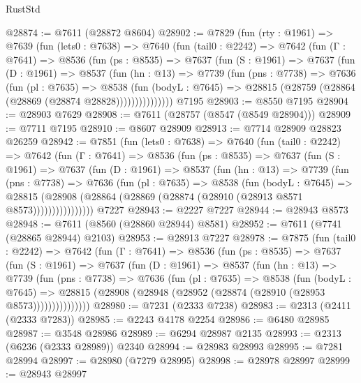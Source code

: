 \begin{lexlean}{RustStd}
\begin{coremodule}
{\begin{coremodule}
{{{{{{{{{{{{{{{{{{{{{{{{{{{{{{{{{{@28874 := @7611 (@28872 @8604)
@28902 := @7829
    (fun (rty : @1961) =>
    @7639
      (fun (lets0 : @7638) =>
      @7640
        (fun (tail0 : @2242) =>
        @7642
          (fun (Γ : @7641) =>
          @8536
            (fun (ps : @8535) =>
            @7637
              (fun (S : @1961) =>
              @7637
                (fun (D : @1961) =>
                @8537
                  (fun (hn : @13) =>
                  @7739
                    (fun (pns : @7738) =>
                    @7636
                      (fun (pl : @7635) =>
                      @8538
                        (fun (bodyL : @7645) =>
                        @28815 (@28759 (@28864 (@28869 (@28874 @28828)))))))))))))))
    @7195
@28903 := @8550 @7195
@28904 := @28903 @7629
@28908 := @7611 (@28757 (@8547 (@8549 @28904)))
@28909 := @7711 @7195
@28910 := @8607 @28909
@28913 := @7714 @28909 @28823 @26259
@28942 := @7851
    (fun (lets0 : @7638) =>
    @7640
      (fun (tail0 : @2242) =>
      @7642
        (fun (Γ : @7641) =>
        @8536
          (fun (ps : @8535) =>
          @7637
            (fun (S : @1961) =>
            @7637
              (fun (D : @1961) =>
              @8537
                (fun (hn : @13) =>
                @7739
                  (fun (pns : @7738) =>
                  @7636
                    (fun (pl : @7635) =>
                    @8538
                      (fun (bodyL : @7645) =>
                      @28815
                        (@28908 (@28864 (@28869 (@28874 (@28910 (@28913 @8571 @8573))))))))))))))))
    @7227
@28943 := @2227 @7227
@28944 := @28943 @8573
@28948 := @7611 (@8560 (@28860 @28944) @8581)
@28952 := @7611 (@7741 (@28865 @28944) @2103)
@28953 := @28913 @7227
@28978 := @7875
    (fun (tail0 : @2242) =>
    @7642
      (fun (Γ : @7641) =>
      @8536
        (fun (ps : @8535) =>
        @7637
          (fun (S : @1961) =>
          @7637
            (fun (D : @1961) =>
            @8537
              (fun (hn : @13) =>
              @7739
                (fun (pns : @7738) =>
                @7636
                  (fun (pl : @7635) =>
                  @8538
                    (fun (bodyL : @7645) =>
                    @28815 (@28908 (@28948 (@28952 (@28874 (@28910 (@28953 @8573)))))))))))))))
@28980 := @7231 (@2333 @7238)
@28983 := @2313 (@2411 (@2333 @7283))
@28985 := @2243 @4178 @2254
@28986 := @6480 @28985
@28987 := @3548 @28986
@28989 := @6294 @28987 @2135
@28993 := @2313 (@6236 (@2333 @28989)) @2340
@28994 := @28983 @28993
@28995 := @7281 @28994
@28997 := @28980 (@7279 @28995)
@28998 := @28978 @28997
@28999 := @28943 @28997
}}}}}}}}}}}}}}}}}}}}}}}}}}}}}}}}}}
\end{coremodule}}
\end{coremodule}
\end{lexlean}
